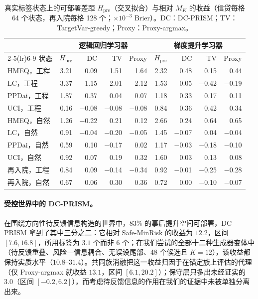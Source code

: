 \documentclass[runningheads]{llncs}
\begin{document}
\begin{table}[t]
\caption{真实标签状态上的可部署差距 $H_{\mathrm{pre}}$（交叉拟合）与相对 $M_K$ 的收益（信贷每格 64 个状态，再入院每格 128 个；$\times10^{-3}$ Brier）。DC：DC-PRISM；TV：TargetVar-greedy；Proxy：Proxy-argmax。}
\label{tab:who}
\centering\scriptsize
\setlength{\tabcolsep}{3pt}
\begin{tabular}{lrrrrrrrr}
\toprule
& \multicolumn{4}{c}{逻辑回归学习器} & \multicolumn{4}{c}{梯度提升学习器} \\
\cmidrule(lr){2-5}\cmidrule(lr){6-9}
状态 & $H_{\mathrm{pre}}$ & DC & TV & Proxy & $H_{\mathrm{pre}}$ & DC & TV & Proxy \\
\midrule
HMEQ，工程 & 3.21 & 0.09 & 1.51 & 1.64 & 2.32 & 0.48 & 0.15 & 0.44 \\
LC，工程 & 3.37 & 1.15 & 2.01 & 2.12 & 1.53 & 0.05 & $-$0.42 & $-$0.19 \\
PPDai，工程 & 1.87 & 0.37 & 0.04 & 0.07 & 1.18 & 0.33 & 0.17 & 0.11 \\
UCI，工程 & 0.16 & $-$0.08 & $-$0.08 & $-$0.08 & 0.84 & 0.36 & 0.42 & 0.34 \\
HMEQ，自然 & 1.26 & $-$0.22 & 0.21 & 0.12 & 2.66 & 0.24 & 0.64 & 0.65 \\
LC，自然 & 0.91 & $-$0.04 & $-$0.20 & $-$0.05 & 1.45 & $-$0.07 & 0.04 & $-$0.04 \\
PPDai，自然 & 0.59 & 0.10 & $-$0.17 & 0.02 & 1.17 & $-$0.03 & $-$0.18 & $-$0.10 \\
UCI，自然 & 0.92 & 0.07 & 0.19 & 0.32 & 1.60 & 0.03 & 0.13 & 0.08 \\
再入院，工程 & 0.84 & 0.09 & $-$0.14 & $-$0.34 & 0.92 & $-$0.01 & $-$0.25 & $-$0.28 \\
再入院，自然 & 0.67 & 0.06 & 0.30 & 0.36 & 0.72 & 0.00 & $-$0.10 & $-$0.07 \\
\bottomrule
\end{tabular}
\end{table}

\paragraph{受控世界中的 DC-PRISM。}在围绕方向性待反馈信息构造的世界中，83\% 的事后提升空间可部署，DC-PRISM 拿到了其中三分之二：它相对 Safe-MinRisk 的收益为 $12.2$，区间 $[7.6,16.8]$，所用标签为 $3.1$ 个而非 6 个；在我们尝试的全部十二种生成器变体中（待反馈重叠、风险—信息耦合、无误设尾部、48 个候选且 $K=12$），该收益都保持实质水平（$10.8$--$31.4$）。共同族消融把这一收益归因于在锚定族上评估的代理（仅 Proxy-argmax 就收益 $13.1$，区间 $[6.1,20.2]$）；保守层只多出未经证实的 $3.0$（区间 $[-0.2,6.2]$），而考虑待反馈信息的作用在我们的证据中未被单独分离出来。
\end{document}
